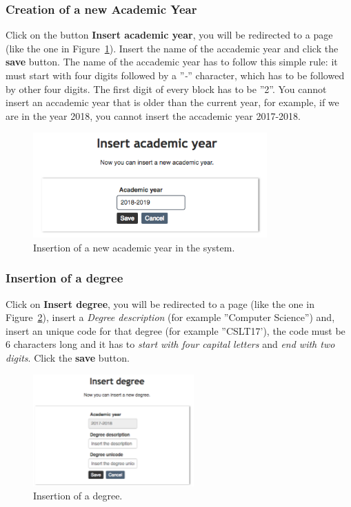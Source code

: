 \subsubsection{Creation of a new Academic Year}
Click on the button \textbf{Insert academic year}, you will be redirected to a page (like the one in Figure~\ref{fig:academicYInsertion}). Insert the name of the accademic year and click the \textbf{save} button. The name of the accademic year has to follow this simple rule: it must start with four digits followed by a ''\emph{-}'' character, which has to be	 followed by other four digits. The first digit of every block has to be ''2''. You cannot insert an accademic year that is older than the current year, for example, if we are in the year 2018, you cannot insert the accademic year 2017-2018.
\begin{figure}[!h]
	\centering
	\includegraphics[width=0.80\textwidth]{img/academicYInsertion.png}
	\caption{Insertion of a new academic year in the system.}
	\label{fig:academicYInsertion}
\end{figure}

\subsubsection{Insertion of a degree} \label{sssec:degIns}
Click on \textbf{Insert degree}, you will be redirected to a page (like the one in Figure~\ref{fig:degreeInsertion}), insert a \emph{Degree description}  (for example ''Computer Science'') and, insert an unique code for that degree (for example ''CSLT17'), the code must be 6 characters long and it has to \emph{ start with four capital letters} and \emph{end with two digits}. Click the \textbf{save} button.
\begin{figure}[!h]
  \centering
  \includegraphics[width=0.55\textwidth]{img/degreeInsertion.png}
  \caption{Insertion of a degree.}
  \label{fig:degreeInsertion}
\end{figure}


